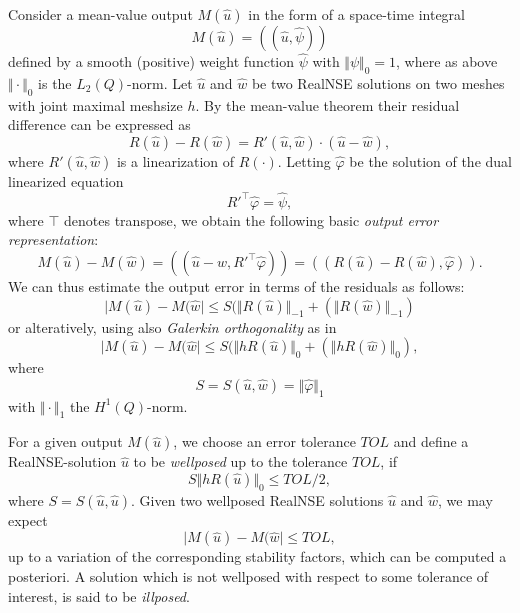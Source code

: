 Consider a mean-value output $M(\hat u)$ in the form of a space-time integral
\begin{equation}
M(\hat u)=((\hat u,\hat\psi ))
\end{equation}
defined by a smooth (positive) weight function $\hat\psi$ with 
$\Vert\psi\Vert_0=1$, where as above $\Vert\cdot\Vert_0$ is the $L_2(Q)$-norm.
Let $\hat u$ and $\hat w$ be 
two RealNSE solutions on two meshes with joint maximal meshsize $h$.
By the mean-value theorem their residual difference can be expressed
as
\[
R(\hat u)-R(\hat w)=R'(\hat u,\hat w)\cdot (\hat u-\hat w),
\]
where $R'(\hat u,\hat w)$ is a linearization of $R(\cdot )$. Letting  
$\hat\varphi$ be the solution of the dual linearized equation
\begin{equation}\label{dual}
R'^\top\hat \varphi =\hat\psi,
\end{equation}
where $\top$ denotes transpose, 
we obtain the following basic \emph{output error representation}:
\begin{equation}\label{errorrepr}
M(\hat u)-M(\hat w)=((\hat u-\hat w,R'^\top\hat\varphi ))=((R(\hat u)-R(\hat w),\hat\varphi )).
\end{equation}
We can thus estimate the output error in terms of the residuals as
follows: 
\begin{equation}\label{apost1}
\vert M(\hat u)- M(\hat w\vert\le S
(\Vert R(\hat u)\Vert_{-1}+(\Vert R(\hat w)\Vert_{-1})
\end{equation}
or alteratively, using also \emph{Galerkin orthogonality} as in \cite{ambsflow} 
\begin{equation}\label{apost0}
\vert M(\hat u)- M(\hat w\vert\le S
(\Vert h R(\hat u)\Vert_{0}+(\Vert h R(\hat w)\Vert_{0}) ,
\end{equation}
where
\begin{equation}\label{Suw}
S=S(\hat u,\hat w)=\Vert\hat\varphi\Vert_1
\end{equation}
with $\Vert\cdot\Vert_1$ the $H^1(Q)$-norm.

For a given output $M(\hat u)$, we choose an error tolerance 
$TOL$ and define a RealNSE-solution $\hat u$ to be \emph{wellposed}
up to the tolerance $TOL$, if  
\begin{equation}\label{tol1}
S\Vert h R(\hat u)\Vert_{0}\le TOL/2 ,
\end{equation}
where $S=S(\hat u,\hat u)$. Given two wellposed RealNSE solutions $\hat u$ and
$\hat w$, we may expect
\begin{equation}\label{tol2}
\vert M(\hat u)- M(\hat w\vert\le TOL ,
\end{equation}
up to a variation of the corresponding stability factors, which
can be computed a posteriori. A solution which is not wellposed
with respect to some tolerance of interest, is said to be \emph{illposed}.
 




